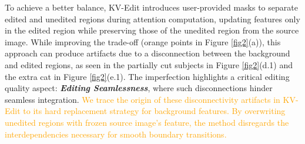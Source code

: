 \documentclass{article}
\begin{document}

To achieve a better balance, KV-Edit \citep{zhu2025kv} introduces user-provided masks to separate edited and unedited regions during attention computation, updating features only in the edited region while preserving those of the unedited region from the source image. While improving the trade-off (orange points in Figure \ref{fig2}(a)), this approach can produce artifacts due to a disconnection between the background and edited regions, as seen in the partially cut subjects in Figure \ref{fig2}(d.1) and the extra cat in Figure \ref{fig2}(e.1). The imperfection highlights a critical editing quality aspect: \textbf{\textit{Editing Seamlessness}}, where such disconnections hinder seamless integration. \textcolor{orange}{We trace the origin of these disconnectivity artifacts in KV-Edit to its hard replacement strategy for background features. By overwriting unedited regions with frozen source image's feature, the method disregards the interdependencies necessary for smooth boundary transitions.}







\end{document}
